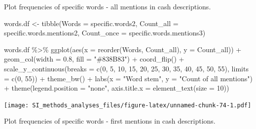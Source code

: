 \documentclass[
]{article}
\newenvironment{Shaded}{\begin{snugshade}}{\end{snugshade}}
\newcommand{\AttributeTok}[1]{\textcolor[rgb]{0.77,0.63,0.00}{#1}}
\newcommand{\DecValTok}[1]{\textcolor[rgb]{0.00,0.00,0.81}{#1}}
\newcommand{\FloatTok}[1]{\textcolor[rgb]{0.00,0.00,0.81}{#1}}
\newcommand{\FunctionTok}[1]{\textcolor[rgb]{0.00,0.00,0.00}{#1}}
\newcommand{\NormalTok}[1]{#1}
\newcommand{\OtherTok}[1]{\textcolor[rgb]{0.56,0.35,0.01}{#1}}
\newcommand{\SpecialCharTok}[1]{\textcolor[rgb]{0.00,0.00,0.00}{#1}}
\newcommand{\StringTok}[1]{\textcolor[rgb]{0.31,0.60,0.02}{#1}}
\begin{document}
Plot frequencies of specific words - all mentions in cash descriptions.

\begin{Shaded}
\begin{Highlighting}[]
\NormalTok{words.df }\OtherTok{\textless{}{-}} \FunctionTok{tibble}\NormalTok{(}\AttributeTok{Words =}\NormalTok{ specific.words2, }
                            \AttributeTok{Count\_all =}\NormalTok{ specific.words.mentions2,}
                            \AttributeTok{Count\_once =}\NormalTok{ specific.words.mentions3)}

\NormalTok{words.df }\SpecialCharTok{\%\textgreater{}\%}
    \FunctionTok{ggplot}\NormalTok{(}\FunctionTok{aes}\NormalTok{(}\AttributeTok{x =} \FunctionTok{reorder}\NormalTok{(Words, Count\_all), }\AttributeTok{y =}\NormalTok{ Count\_all)) }\SpecialCharTok{+} 
    \FunctionTok{geom\_col}\NormalTok{(}\AttributeTok{width =} \FloatTok{0.8}\NormalTok{, }\AttributeTok{fill =} \StringTok{"\#838B83"}\NormalTok{) }\SpecialCharTok{+}
    \FunctionTok{coord\_flip}\NormalTok{() }\SpecialCharTok{+}
    \FunctionTok{scale\_y\_continuous}\NormalTok{(}\AttributeTok{breaks =} \FunctionTok{c}\NormalTok{(}\DecValTok{0}\NormalTok{, }\DecValTok{5}\NormalTok{, }\DecValTok{10}\NormalTok{, }\DecValTok{15}\NormalTok{, }\DecValTok{20}\NormalTok{, }\DecValTok{25}\NormalTok{, }\DecValTok{30}\NormalTok{, }\DecValTok{35}\NormalTok{, }\DecValTok{40}\NormalTok{, }\DecValTok{45}\NormalTok{, }\DecValTok{50}\NormalTok{, }\DecValTok{55}\NormalTok{), }\AttributeTok{limits =} \FunctionTok{c}\NormalTok{(}\DecValTok{0}\NormalTok{, }\DecValTok{55}\NormalTok{)) }\SpecialCharTok{+}
    \FunctionTok{theme\_bw}\NormalTok{() }\SpecialCharTok{+} 
    \FunctionTok{labs}\NormalTok{(}\AttributeTok{x =} \StringTok{"Word stem"}\NormalTok{, }\AttributeTok{y =} \StringTok{"Count of all mentions"}\NormalTok{) }\SpecialCharTok{+} 
    \FunctionTok{theme}\NormalTok{(}\AttributeTok{legend.position =} \StringTok{"none"}\NormalTok{, }\AttributeTok{axis.title.x =} \FunctionTok{element\_text}\NormalTok{(}\AttributeTok{size =} \DecValTok{10}\NormalTok{))}
\end{Highlighting}
\end{Shaded}

\texttt{[image: SI\_methods\_analyses\_files/figure-latex/unnamed-chunk-74-1.pdf]}

Plot frequencies of specific words - first mentions in cash
descriptions.
\end{document}
